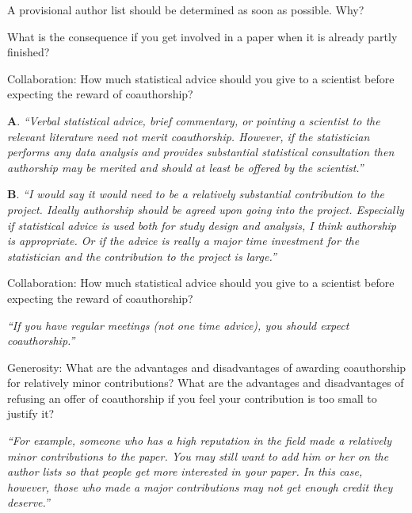 \documentclass[portrait,11pt]{seminar}
\begin{document}
\es
\bs


A provisional author list should be determined as soon as possible. Why? 

\medskip

What is the consequence if you get involved in a paper when it is already partly finished?



\es \bs Collaboration: How much statistical advice should you give to a scientist before expecting the reward of coauthorship?

{\bf A}. {\it ``Verbal statistical advice, brief commentary, or pointing a scientist to the relevant literature need not merit coauthorship. However, if the statistician performs any data analysis and provides substantial statistical consultation then authorship may be merited and should at least be offered by the scientist.''}

\medskip

{\bf B}. {\it ``I would say it would need to be a relatively substantial contribution to the project. Ideally authorship should be agreed upon going into the project. Especially if statistical advice is used both for study design and analysis, I think authorship is appropriate. Or if the advice is really a major time investment for the statistician and the contribution to the project is large.''}


\es

\bs
Collaboration: How much statistical advice should you give to a scientist before expecting the reward of coauthorship?

{\it ``If you have regular meetings (not one time advice), you should expect coauthorship.''}


\es \bs Generosity: What are the advantages and disadvantages of awarding coauthorship for relatively minor contributions? What are the advantages and disadvantages of refusing an offer of coauthorship if you feel your contribution is too small to justify it?

{\it ``For example, someone who has a high reputation in the field made a relatively minor contributions to the paper. You may still want to add him or her on the author lists so that people get more interested in your paper. In this case, however, those who made a major contributions may not get enough credit they deserve.''}

\medskip
\end{document}
